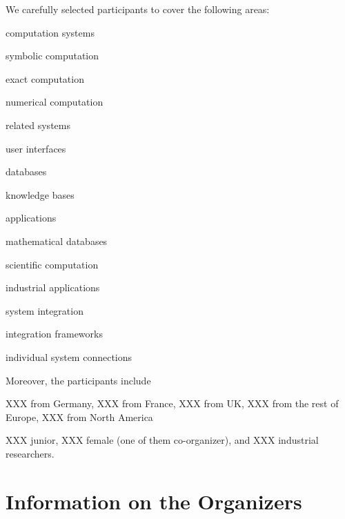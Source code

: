 \documentclass[a4paper,11pt]{article}
\begin{document}
\noindent
We carefully selected participants to cover the following areas:
\begin{compactitem}
\item computation systems
  \begin{compactitem}
    \item symbolic computation
    \item exact computation
    \item numerical computation
  \end{compactitem}
\item related systems
  \begin{compactitem}
    \item user interfaces
    \item databases
    \item knowledge bases
  \end{compactitem}
\item applications
  \begin{compactitem}
    \item mathematical databases
    \item scientific computation
    \item industrial applications
  \end{compactitem}
\item system integration
  \begin{compactitem}
    \item integration frameworks
    \item individual system connections
  \end{compactitem}
\end{compactitem}
\medskip

\noindent
Moreover, the participants include
\begin{compactitem}
\item XXX from Germany, XXX from France, XXX from UK, XXX from the rest of Europe, XXX from North America
\item XXX junior, XXX female (one of them co-organizer), and XXX industrial researchers.
\end{compactitem}

\section{Information on the Organizers}
\end{document}
